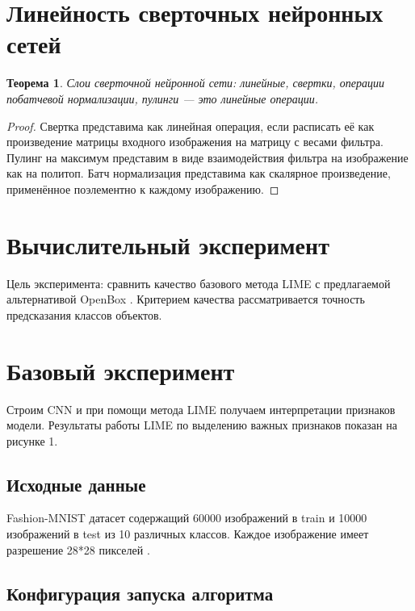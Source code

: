 \documentclass[12pt]{article}
\begin{document}
\section{Линейность сверточных нейронных сетей}

\newtheorem{theorem}{Теорема}
\begin{theorem}
Слои сверточной нейронной сети: линейные, свертки, операции побатчевой нормализации, пулинги --- это линейные операции.
\end{theorem}

\begin{proof}
Свертка представима как линейная операция, если расписать её как произведение матрицы входного изображения на матрицу с весами фильтра. Пулинг на максимум представим в виде взаимодействия фильтра на изображение как на политоп. Батч нормализация представима как скалярное произведение, применённое поэлементно к каждому изображению.
\end{proof}

\section{Вычислительный эксперимент}

Цель эксперимента: сравнить качество базового метода LIME \cite{ribeiro2016why} с предлагаемой альтернативой OpenBox \cite{chu2019exact}. Критерием качества рассматривается точность предсказания классов объектов.

\section{Базовый эксперимент}


Строим CNN и при помощи метода LIME \cite{ribeiro2016why} получаем интерпретации признаков модели. Результаты работы LIME по выделению важных признаков показан на рисунке 1.

\subsection{Исходные данные}

  Fashion-MNIST датасет содержащий 60000 изображений в train и 10000 изображений в test из 10 различных классов. Каждое изображение имеет разрешение 28*28 пикселей  \citep{fashionmnist}.

\subsection{Конфигурация запуска алгоритма}
\end{document}
